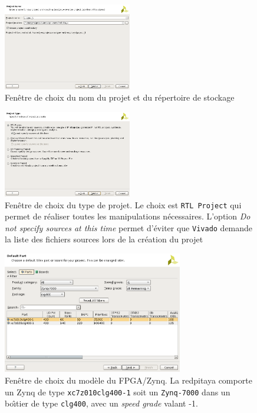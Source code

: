 \documentclass[12pt,oneside]{article}
\begin{document}
\begin{figure}[h!tb]
\begin{center}
\includegraphics[width=0.5\textwidth]{./createProj1.png}
\end{center}
\caption{Fen\^etre de choix du nom du projet et du r\'epertoire de stockage}
\label{createProj1}
\end{figure}
\begin{figure}[h!tb]
\begin{center}
\includegraphics[width=0.5\textwidth]{./createProj_selectType.png}
\end{center}
\caption{Fen\^etre de choix du type de projet. Le choix est {\tt RTL Project}
qui permet de r\'ealiser toutes les manipulations n\'ecessaires. L'option {\em
Do not specify sources at this time} permet d'\'eviter que {\tt Vivado} demande
la liste des fichiers sources lors de la cr\'eation du projet}
\label{createProj_selectType}
\end{figure}
\begin{figure}[h!tb]
\begin{center}
\includegraphics[width=0.7\textwidth]{./createProj_selectPart.png}
\end{center}
\caption{Fen\^etre de choix du mod\`ele du FPGA/Zynq. La redpitaya comporte un
Zynq de type {\tt xc7z010clg400-1} soit
un {\tt Zynq-7000} dans un bo\^\i tier de type {\tt clg400}, avec un {\em speed
grade} valant -1.}
\label{createProj_selectpart}
\end{figure}
\end{document}
